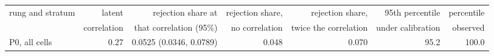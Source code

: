 \begin{tabular}{lrrrrrr}
\toprule
rung and stratum & latent & rejection share at & rejection share, & rejection share, & 95th percentile & percentile \\
 & correlation & that correlation (95\%) & no correlation & twice the correlation & under calibration & observed \\
\midrule
P0, all cells & 0.27 & 0.0525 (0.0346, 0.0789) & 0.048 & 0.070 & 95.2 & 100.0 \\

\end{tabular}
